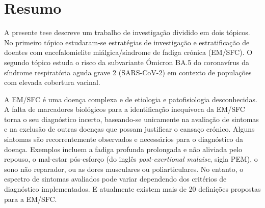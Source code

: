 \section*{Resumo}


A presente tese descreve um trabalho de investigação dividido em dois tópicos. No primeiro tópico estudaram-se estratégias de investigação e estratificação de doentes com encefalomielite miálgica/síndrome de fadiga crónica (EM/SFC). O segundo tópico estuda o risco da subvariante Ómicron BA.5 do coronavírus da síndrome respiratória aguda grave 2 (SARS-CoV-2) em contexto de populações com elevada cobertura vacinal.

\bsni
A EM/SFC é uma doença complexa e de etiologia e patofisiologia desconhecidas. A falta de marcadores biológicos para a identificação inequívoca da EM/SFC torna o seu diagnóstico incerto, baseando-se unicamente na avaliação de sintomas e na exclusão de outras doenças que possam justificar o cansaço crónico.
Alguns sintomas são recorrentemente observados e necessários para o diagnóstico da doença. Exemplos incluem a fadiga profunda prolongada e não aliviada pelo repouso, o mal-estar pós-esforço (do inglês \textit{post-exertional malaise}, sigla PEM), o sono não reparador, ou as dores musculares ou poliarticulares. No entanto, o espectro de sintomas avaliados pode variar dependendo dos critérios de diagnóstico implementados. E atualmente existem mais de 20 definições propostas para a EM/SFC.

